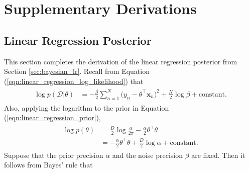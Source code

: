 \documentclass[msc,deptreport.inf]{infthesis} %
\newcommand{\matr}[1]{\mathbf{#1}}
\begin{document}



 \appendix
 
 \chapter{Supplementary Derivations}
 
 \section{Linear Regression Posterior}\label{app:bayesian_linear_regression_posterior}
 
This section completes the derivation of the linear regression posterior from Section \ref{sec:bayesian_lr}. Recall from Equation (\ref{eqn:linear_regression_log_likelihood}) that
\begin{align}
\begin{split}
	\log p(\mathcal{D} | \theta) 
	& = - \frac{\beta}{2} \sum_{n=1}^N \big(y_n - \theta^\intercal \matr{x}_n \big)^2 
	+ \frac{N}{2} \log \beta
	+ \text{constant}.
\end{split}
\end{align}
Also, applying the logarithm to the prior in Equation (\ref{eqn:linear_regression_prior}),
\begin{align}
\begin{split}
	\log p(\theta) 
	& = \frac{D}{2} \log \frac{\alpha}{2\pi} - \frac{\alpha}{2} \theta^\intercal \theta \\
	& = -\frac{\alpha}{2} \theta^\intercal \theta + \frac{D}{2} \log \alpha + \text{constant}.
\end{split}
\end{align}
Suppose that the prior precision $\alpha$ and the noise precision $\beta$ are fixed. Then it follows from Bayes' rule that
\end{document}
